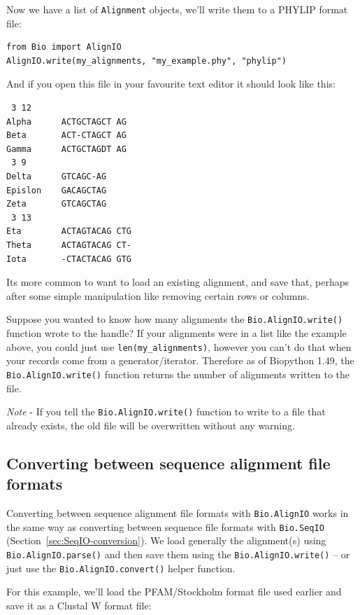 \documentclass{report}
\begin{document}
\noindent Now we have a list of \verb|Alignment| objects, we'll write them to a PHYLIP format file:

\begin{verbatim}
from Bio import AlignIO
AlignIO.write(my_alignments, "my_example.phy", "phylip")
\end{verbatim}

\noindent And if you open this file in your favourite text editor it should look like this:

\begin{verbatim}
 3 12
Alpha      ACTGCTAGCT AG
Beta       ACT-CTAGCT AG
Gamma      ACTGCTAGDT AG
 3 9
Delta      GTCAGC-AG
Epislon    GACAGCTAG
Zeta       GTCAGCTAG
 3 13
Eta        ACTAGTACAG CTG
Theta      ACTAGTACAG CT-
Iota       -CTACTACAG GTG
\end{verbatim}

Its more common to want to load an existing alignment, and save that, perhaps after some simple manipulation like removing certain rows or columns.

Suppose you wanted to know how many alignments the \verb|Bio.AlignIO.write()| function wrote to the handle? If your alignments were in a list like the example above, you could just use \verb|len(my_alignments)|, however you can't do that when your records come from a generator/iterator.  Therefore as of Biopython 1.49, the \verb|Bio.AlignIO.write()| function returns the number of alignments written to the file.   

\emph{Note} - If you tell the \verb|Bio.AlignIO.write()| function to write to a file that already exists, the old file will be overwritten without any warning.


\subsection{Converting between sequence alignment file formats}
\label{sec:converting-alignments}

Converting between sequence alignment file formats with \verb|Bio.AlignIO| works
in the same way as converting between sequence file formats with \verb|Bio.SeqIO|
(Section~\ref{sec:SeqIO-conversion}). We load generally the alignment(s) using
\verb|Bio.AlignIO.parse()| and then save them using the \verb|Bio.AlignIO.write()|
-- or just use the \verb|Bio.AlignIO.convert()| helper function.

For this example, we'll load the PFAM/Stockholm format file used earlier and save it as a Clustal W format file:
\end{document}
